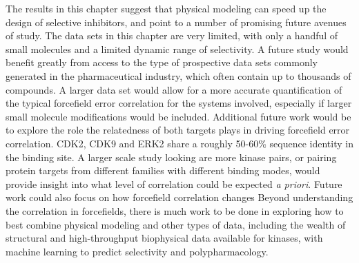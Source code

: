 \documentclass[phd,tocprelim]{cornell}
\begin{document}
The results in this chapter suggest that physical modeling can speed up the design of selective inhibitors, and point to a number of promising future avenues of study. The data sets in this chapter are very limited, with only a handful of small molecules and a limited dynamic range of selectivity. A future study would benefit greatly from access to the type of prospective data sets commonly generated in the pharmaceutical industry, which often contain up to thousands of compounds. A larger data set would allow for a more accurate quantification of the typical forcefield error correlation for the systems involved, especially if larger small molecule modifications would be included.  Additional future work would be to explore the role the relatedness of both targets plays in driving forcefield error correlation. CDK2, CDK9 and ERK2 share a roughly 50-60\% sequence identity in the binding site. A larger scale study looking are more kinase pairs, or pairing protein targets from different families with different binding modes, would provide insight into what level of correlation could be expected \emph{a priori}. Future work could also focus on how forcefield correlation changes Beyond understanding the correlation in forcefields, there is much work to be done in exploring how to best combine physical modeling and other types of data, including the wealth of structural and high-throughput biophysical data available for kinases, with machine learning to predict selectivity and polypharmacology. 
\end{document}
